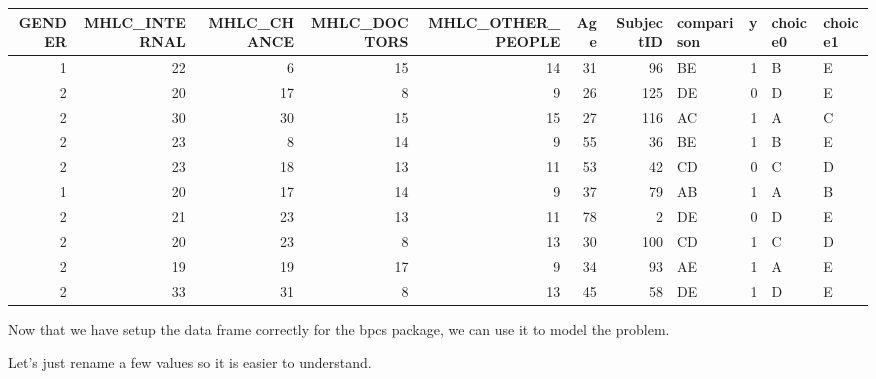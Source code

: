 \documentclass[
]{book}
\begin{document}
\begin{table}[H]
\centering
\begin{tabular}{r|r|r|r|r|r|r|l|r|l|l}
\hline
GENDER & MHLC\_INTERNAL & MHLC\_CHANCE & MHLC\_DOCTORS & MHLC\_OTHER\_PEOPLE & Age & SubjectID & comparison & y & choice0 & choice1\\
\hline
1 & 22 & 6 & 15 & 14 & 31 & 96 & BE & 1 & B & E\\
\hline
2 & 20 & 17 & 8 & 9 & 26 & 125 & DE & 0 & D & E\\
\hline
2 & 30 & 30 & 15 & 15 & 27 & 116 & AC & 1 & A & C\\
\hline
2 & 23 & 8 & 14 & 9 & 55 & 36 & BE & 1 & B & E\\
\hline
2 & 23 & 18 & 13 & 11 & 53 & 42 & CD & 0 & C & D\\
\hline
1 & 20 & 17 & 14 & 9 & 37 & 79 & AB & 1 & A & B\\
\hline
2 & 21 & 23 & 13 & 11 & 78 & 2 & DE & 0 & D & E\\
\hline
2 & 20 & 23 & 8 & 13 & 30 & 100 & CD & 1 & C & D\\
\hline
2 & 19 & 19 & 17 & 9 & 34 & 93 & AE & 1 & A & E\\
\hline
2 & 33 & 31 & 8 & 13 & 45 & 58 & DE & 1 & D & E\\
\hline
\end{tabular}
\end{table}

Now that we have setup the data frame correctly for the bpcs package, we can use it to model the problem.

Let's just rename a few values so it is easier to understand.
\end{document}
